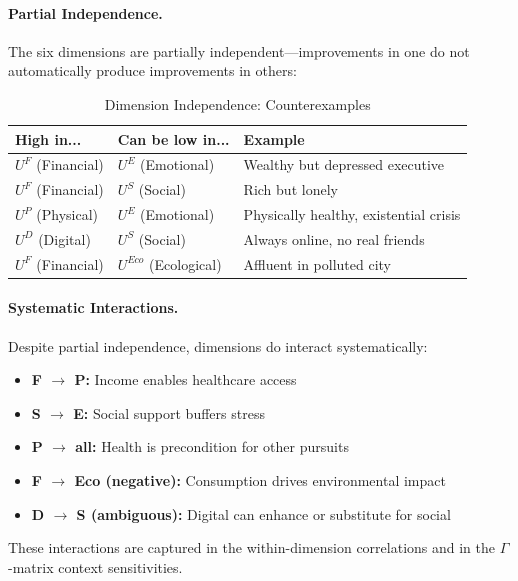\paragraph{Partial Independence.}
The six dimensions are partially independent---improvements in one 
do not automatically produce improvements in others:

\begin{table}[htbp]
\centering
\caption{Dimension Independence: Counterexamples}
\label{tab:dimension-independence}
\renewcommand{\arraystretch}{1.3}
\begin{tabular}{@{}lll@{}}
\toprule
\textbf{High in...} & \textbf{Can be low in...} & \textbf{Example} \\
\midrule
$U^F$ (Financial) & $U^E$ (Emotional) & Wealthy but depressed executive \\
$U^F$ (Financial) & $U^S$ (Social) & Rich but lonely \\
$U^P$ (Physical) & $U^E$ (Emotional) & Physically healthy, existential crisis \\
$U^D$ (Digital) & $U^S$ (Social) & Always online, no real friends \\
$U^F$ (Financial) & $U^{Eco}$ (Ecological) & Affluent in polluted city \\
\bottomrule
\end{tabular}
\end{table}

\paragraph{Systematic Interactions.}
Despite partial independence, dimensions do interact systematically:

\begin{itemize}
\item \textbf{F $\rightarrow$ P:} Income enables healthcare access
\item \textbf{S $\rightarrow$ E:} Social support buffers stress
\item \textbf{P $\rightarrow$ all:} Health is precondition for other pursuits
\item \textbf{F $\rightarrow$ Eco (negative):} Consumption drives environmental impact
\item \textbf{D $\rightarrow$ S (ambiguous):} Digital can enhance or substitute for social
\end{itemize}

These interactions are captured in the within-dimension correlations and 
in the $\Gamma$-matrix context sensitivities.

